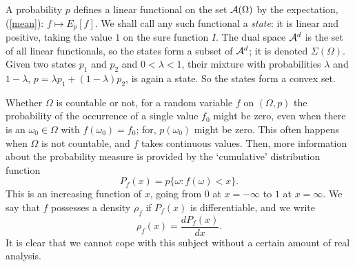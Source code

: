 \documentclass[12pt]{article}
\begin{document}
A probability $p$ defines a linear functional on the set ${\cal A}(\Omega)$
by the expectation, (\ref{mean}): $f\mapsto E_p[f]$.
We shall call any such functional a {\em state}: it is linear and positive,
taking the value $1$ on the sure function $I$.
The dual space ${\cal A}^d$ is the set of all linear functionals, so the
states form a subset of ${\cal A}^d$; it is denoted $\Sigma(\Omega)$.
Given two states $p_1$ and $p_2$ and $0<\lambda<1$, their mixture
with probabilities $\lambda$ and $1-\lambda$, $p=\lambda p_1+(1-
\lambda)p_2$, is again a state. So the states form a convex set.

Whether $\Omega$ is countable or not, for a random variable $f$ on
$(\Omega,p)$
the probability of the occurrence of a single value $f_0$ might be zero,
even when there is an $\omega_0\in\Omega$ with $f(\omega_0)=f_0$;
for, $p(\omega_0)$ might be zero. This often happens when $\Omega$ is
not countable, and $f$ takes continuous values. Then, more information
about the probability measure is provided by the `cumulative'
distribution function
\begin{equation}
P_f(x)=p\{\omega:f(\omega)<x\}.
\end{equation}
This is an increasing function of $x$, going from $0$ at $x=-\infty$ to $1$
at $x=\infty$.
We say that $f$ possesses a density $\rho_f$ if $P_f(x)$ is
differentiable, and we write
\begin{equation}
\rho_f(x)=\frac{dP_f(x)}{dx}.
\end{equation}
It is clear that we cannot cope with this subject without a certain
amount of real analysis.
\end{document}
